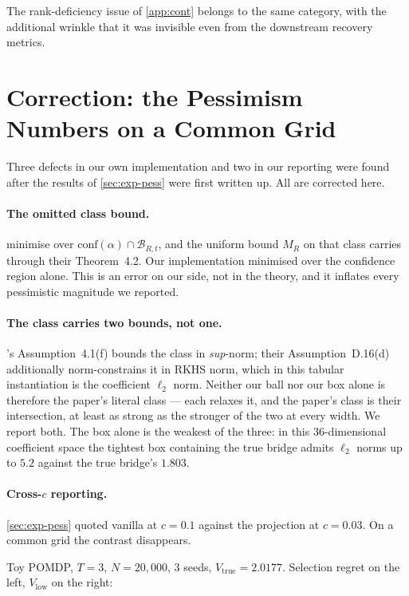 The rank-deficiency issue of \cref{app:cont} belongs to the same category, with
the additional wrinkle that it was invisible even from the downstream recovery
metrics.

\section{Correction: the Pessimism Numbers on a Common Grid}
\label{app:pess-correction}

Three defects in our own implementation and two in our reporting were found after
the results of \cref{sec:exp-pess} were first written up. All are corrected here.

\paragraph{The omitted class bound.} \citet{hong2024} minimise over
$\mathrm{conf}(\alpha) \cap \mathcal{B}_{R,t}$, and the uniform bound $M_R$ on
that class carries through their Theorem~4.2. Our implementation minimised over
the confidence region alone. This is an error on our side, not in the theory, and
it inflates every pessimistic magnitude we reported.

\paragraph{The class carries two bounds, not one.} \citeauthor{hong2024}'s
Assumption~4.1(f) bounds the class in \emph{sup}-norm; their Assumption~D.16(d)
additionally norm-constrains it in
RKHS norm, which in this tabular instantiation is the coefficient $\ell_2$ norm.
Neither our ball nor our box alone is therefore the paper's literal class ---
each relaxes it, and the paper's class is their intersection, at least as strong
as the stronger of the two at every width. We report both. The box alone is the
weakest of the three: in this $36$-dimensional coefficient space the tightest box
containing the true bridge admits $\ell_2$ norms up to $5.2$ against the true
bridge's $1.803$.

\paragraph{Cross-$c$ reporting.} \cref{sec:exp-pess} quoted vanilla at $c{=}0.1$
against the projection at $c{=}0.03$. On a common grid the contrast disappears.

Toy POMDP, $T{=}3$, $N{=}20{,}000$, $3$ seeds, $V_{\mathrm{true}} = 2.0177$.
Selection regret on the left, $V_{\mathrm{low}}$ on the right:

